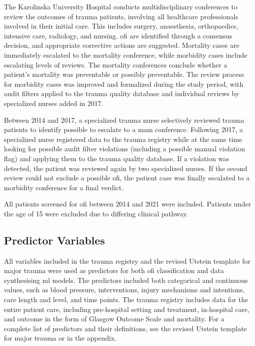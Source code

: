 \documentclass[12pt, a4paper]{article}
\begin{document}
The Karolinska University Hospital conducts multidisciplinary conferences to review the outcomes of trauma patients, involving all healthcare professionals involved in their initial care. This includes surgery, anaesthesia, orthopaedics, intensive care, radiology, and nursing. \acrshort{ofi} are identified through a consensus decision, and appropriate corrective actions are suggested. Mortality cases are immediately escalated to the mortality conference, while morbidity cases include escalating levels of reviews. The mortality conferences conclude whether a patient's mortality was preventable or possibly preventable. The review process for morbidity cases was improved and formalized during the study period, with audit filters applied to the trauma quality database and individual reviews by specialized nurses added in 2017.

Between 2014 and 2017, a specialized trauma nurse selectively reviewed trauma patients to identify possible  to escalate to a \acrshort{mam} conference. Following 2017, a specialized nurse registered data to the trauma registry while at the same time looking for possible audit filter violations (including a possible manual violation flag) and applying them to the trauma quality database. If a violation was detected, the patient was reviewed again by two specialized nurses. If the second review could not exclude a possible \acrshort{ofi}, the patient case was finally escalated to a morbidity conference for a final verdict.

All patients screened for \acrshort{ofi} between 2014 and 2021 were included. Patients under the age of 15 were excluded due to differing clinical pathway.

\subsection{Predictor Variables}
All variables included in the trauma registry and the revised Utstein template for major trauma were used as predictors for both \acrshort{ofi} classification and data synthesising \acrshort{ml} models. The predictors included both categorical and continuous values, such as blood pressure, interventions, injury mechanisms and intentions, care length and level, and time points. The trauma registry includes data for the entire patient care, including pre-hospital setting and treatment, in-hospital care, and outcome in the form of Glasgow Outcome Scale and mortality. For a complete list of predictors and their definitions, see the revised Utstein template for major trauma \cite{ringdal_utstein_2008} or  in the appendix.
\end{document}
